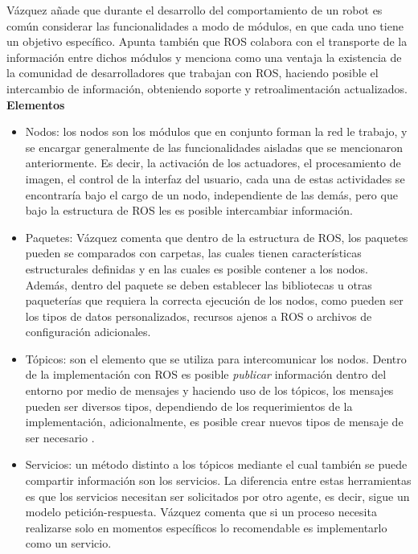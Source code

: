             Vázquez añade que durante el desarrollo del comportamiento de un robot es común considerar las funcionalidades a modo de módulos, en que cada uno tiene un objetivo específico. Apunta también que ROS colabora con el transporte de la información entre dichos módulos y menciona como una ventaja la existencia de la comunidad de desarrolladores que trabajan con ROS, haciendo posible el intercambio de información, obteniendo soporte y retroalimentación actualizados. \phantom{saltodelineaforzado >:D}\\

            \textbf{Elementos}
            \begin{itemize}
                \item Nodos: los nodos son los módulos que en conjunto forman la red le trabajo, y se encargar generalmente de las funcionalidades aisladas que se mencionaron anteriormente. Es decir, la activación de los actuadores, el procesamiento de imagen, el control de la interfaz del usuario, cada una de estas actividades se encontraría bajo el cargo de un nodo, independiente de las demás, pero que bajo la estructura de ROS les es posible intercambiar información.
                \item Paquetes: Vázquez comenta que dentro de la estructura de ROS, los paquetes pueden se comparados con carpetas, las cuales tienen características estructurales definidas y en las cuales es posible contener a los nodos. Además, dentro del paquete se deben establecer las bibliotecas u otras paqueterías que requiera la correcta ejecución de los nodos, como pueden ser los tipos de datos personalizados, recursos ajenos a ROS o archivos de configuración adicionales. 
                \item Tópicos: son el elemento que se utiliza para intercomunicar los nodos. Dentro de la implementación con ROS es posible \textit{publicar} información dentro del entorno por medio de mensajes y haciendo uso de los tópicos, los mensajes pueden ser diversos tipos, dependiendo de los requerimientos de la implementación, adicionalmente, es posible crear nuevos tipos de mensaje de ser necesario \cite{ros_wiki_std_msgs}. 
                \item Servicios: un método distinto a los tópicos mediante el cual también se puede compartir información son los servicios. La diferencia entre estas herramientas es que los servicios necesitan ser solicitados por otro agente, es decir, sigue un modelo petición-respuesta. Vázquez comenta que si un proceso necesita realizarse solo en momentos específicos lo recomendable es implementarlo como un servicio.
            \end{itemize}

